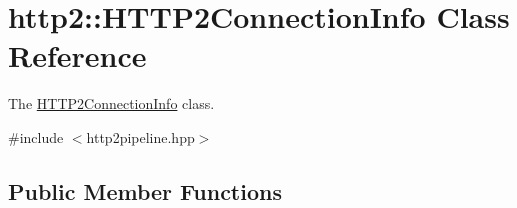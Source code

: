\hypertarget{classhttp2_1_1HTTP2ConnectionInfo}{}\section{http2\+:\+:H\+T\+T\+P2\+Connection\+Info Class Reference}
\label{classhttp2_1_1HTTP2ConnectionInfo}


The \hyperlink{classhttp2_1_1HTTP2ConnectionInfo}{H\+T\+T\+P2\+Connection\+Info} class.  




{\ttfamily \#include $<$http2pipeline.\+hpp$>$}

\subsection*{Public Member Functions}
